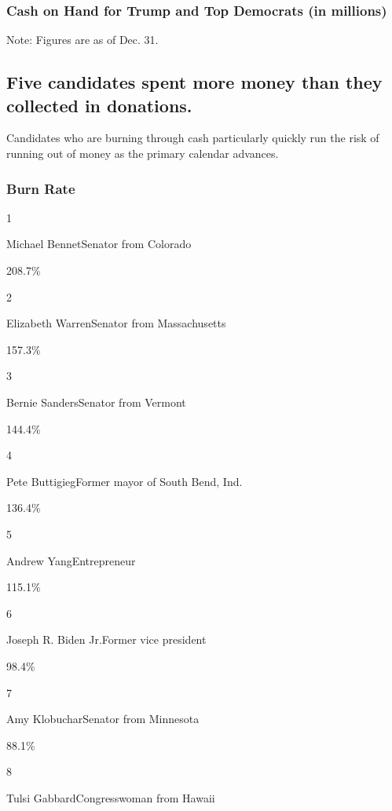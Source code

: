 \hypertarget{cash-on-hand-for-trump-and-top-democrats-in-millions}{%
\subsubsection{Cash on Hand for Trump and Top Democrats (in
millions)}\label{cash-on-hand-for-trump-and-top-democrats-in-millions}}

Note: Figures are as of Dec. 31.

\hypertarget{five-candidates-spent-more-money-than-they-collected-in-donations}{%
\subsection{Five candidates spent more money than they collected in
donations.}\label{five-candidates-spent-more-money-than-they-collected-in-donations}}

Candidates who are burning through cash particularly quickly run the
risk of running out of money as the primary calendar advances.

\hypertarget{burn-rate}{%
\subsubsection{Burn Rate}\label{burn-rate}}

1

Michael BennetSenator from Colorado

208.7\%

2

Elizabeth WarrenSenator from Massachusetts

157.3\%

3

Bernie SandersSenator from Vermont

144.4\%

4

Pete ButtigiegFormer mayor of South Bend, Ind.

136.4\%

5

Andrew YangEntrepreneur

115.1\%

6

Joseph R. Biden Jr.Former vice president

98.4\%

7

Amy KlobucharSenator from Minnesota

88.1\%

8

Tulsi GabbardCongresswoman from Hawaii

